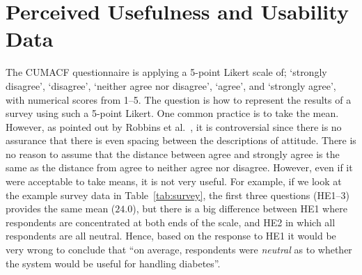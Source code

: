 \section{Perceived Usefulness and Usability Data}

The \ac{CUMACF} questionnaire is applying a 5-point Likert scale of; `strongly disagree', `disagree', `neither agree nor disagree', `agree', and `strongly agree', with numerical scores from 1--5.
%
The question is how to represent the results of a survey using such a 5-point Likert.
%
One common practice is to take the mean. However, as pointed out by Robbins et al.~\cite{robbins2011plotting}, it is controversial since there is no assurance that there is even spacing between the descriptions of attitude. There is no reason to assume that the distance between agree and strongly agree is the same as the distance from agree to neither agree nor disagree. However, even if it were acceptable to take means, it is not very useful.
%
For example, if we look at the example survey data in Table~\ref{tab:survey}, the first three questions (HE1--3) provides the same mean ($24.0$), but there is a big difference between HE1 where respondents are concentrated at both ends of the scale, and HE2 in which all respondents are all neutral. Hence, based on the response to HE1 it would be very wrong to conclude that ``on average, respondents were \textit{neutral} as to whether the system would be useful for handling diabetes''.


